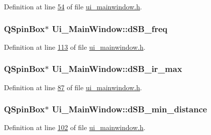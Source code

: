 Definition at line \hyperlink{a00139_source_l00054}{54} of file \hyperlink{a00139_source}{ui\+\_\+mainwindow.\+h}.

\hypertarget{a00080_abd528de839feccc001dc62b3aecddc9f}{
\subsubsection[{d\+S\+B\+\_\+freq}]{\setlength{\rightskip}{0pt plus 5cm}Q\+Spin\+Box$\ast$ Ui\+\_\+\+Main\+Window\+::d\+S\+B\+\_\+freq}}\label{a00080_abd528de839feccc001dc62b3aecddc9f}


Definition at line \hyperlink{a00139_source_l00113}{113} of file \hyperlink{a00139_source}{ui\+\_\+mainwindow.\+h}.

\hypertarget{a00080_a220706f1fd93857145032c897e55d9e3}{
\subsubsection[{d\+S\+B\+\_\+ir\+\_\+max}]{\setlength{\rightskip}{0pt plus 5cm}Q\+Spin\+Box$\ast$ Ui\+\_\+\+Main\+Window\+::d\+S\+B\+\_\+ir\+\_\+max}}\label{a00080_a220706f1fd93857145032c897e55d9e3}


Definition at line \hyperlink{a00139_source_l00087}{87} of file \hyperlink{a00139_source}{ui\+\_\+mainwindow.\+h}.

\hypertarget{a00080_a01c23085590f4947828948bbd9f50cc7}{
\subsubsection[{d\+S\+B\+\_\+min\+\_\+distance}]{\setlength{\rightskip}{0pt plus 5cm}Q\+Spin\+Box$\ast$ Ui\+\_\+\+Main\+Window\+::d\+S\+B\+\_\+min\+\_\+distance}}\label{a00080_a01c23085590f4947828948bbd9f50cc7}


Definition at line \hyperlink{a00139_source_l00102}{102} of file \hyperlink{a00139_source}{ui\+\_\+mainwindow.\+h}.

